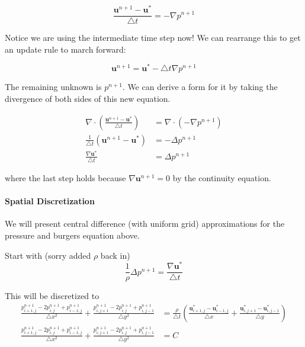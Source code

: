 \documentclass[12pt]{article}
\begin{document}
\begin{equation}
    \frac{\mathbf{u}^{n+1} - \mathbf{u}^*}{\bigtriangleup t} = -\nabla p^{n+1}
\end{equation}

Notice we are using the intermediate time step now! We can rearrange this to get an update rule to march forward:

\begin{equation}
    \mathbf{u}^{n+1} = \mathbf{u}^* - \bigtriangleup t \nabla p^{n+1}
\end{equation}

The remaining unknown is $p^{n+1}$. We can derive a form for it by taking the divergence of both sides of this new equation.

\begin{align*}
    \nabla \cdot (\frac{\mathbf{u}^{n+1} - \mathbf{u}^*}{\bigtriangleup t}) &= \nabla \cdot (-\nabla p^{n+1}) \\
    \frac{1}{\bigtriangleup t}(\mathbf{u}^{n+1} - \mathbf{u}^*) &= -\Delta p^{n+1} \\
    \frac{\nabla \mathbf{u}^*}{\bigtriangleup t} &= \Delta p^{n+1}
\end{align*}

where the last step holds because $\nabla \mathbf{u}^{n+1} = 0$ by the continuity equation.

\paragraph{Spatial Discretization}

We will present central difference (with uniform grid) approximations for the pressure and burgers equation above.

Start with (sorry added $\rho$ back in)
\begin{equation}
\frac{1}{\rho} \Delta p^{n+1} = \frac{\nabla \mathbf{u}^*}{\bigtriangleup t}
\end{equation}

This will be discretized to
\begin{align*}
    \frac{p^{n+1}_{i+1,j} - 2p^{n+1}_{i,j} + p^{n+1}_{i-1,j}}{\bigtriangleup x^2} + \frac{p^{n+1}_{i,j+1} - 2p^{n+1}_{i,j} + p^{n+1}_{i,j-1}}{\bigtriangleup y^2} &= \frac{\rho}{\bigtriangleup t}(\frac{\mathbf{u}^*_{i+1,j} - \mathbf{u}^*_{i-1,j}}{\bigtriangleup x} + \frac{\mathbf{u}^*_{i,j+1} - \mathbf{u}^*_{i,j-1}}{\bigtriangleup y}) \\
    \frac{p^{n+1}_{i+1,j} - 2p^{n+1}_{i,j} + p^{n+1}_{i-1,j}}{\bigtriangleup x^2} + \frac{p^{n+1}_{i,j+1} - 2p^{n+1}_{i,j} + p^{n+1}_{i,j-1}}{\bigtriangleup y^2} &= C
\end{align*}
\end{document}

